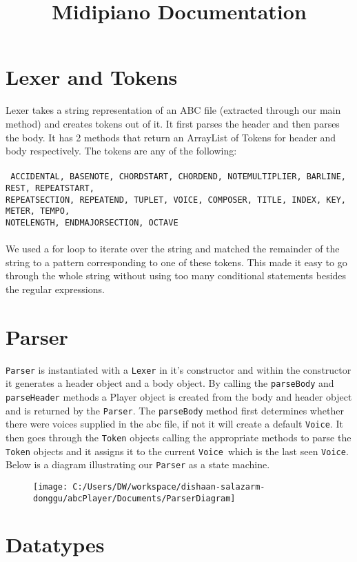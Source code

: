 \documentclass{article}
\title{Midipiano Documentation }
\begin{document}
\setlength{\headheight}{24pt}

\section{Lexer and Tokens}
 Lexer takes a string representation of an ABC file (extracted through our main method) and creates tokens out of it. It first parses the header and then parses the body. It has 2 methods that return an ArrayList of Tokens for header and body respectively. The tokens are any of the following:\\ \\
\texttt{
		ACCIDENTAL, BASENOTE, CHORDSTART, CHORDEND, NOTEMULTIPLIER, 
		BARLINE, REST, REPEATSTART,\\ REPEATSECTION, REPEATEND, TUPLET, VOICE,
		COMPOSER, TITLE, INDEX, KEY, METER, TEMPO, \\NOTELENGTH, ENDMAJORSECTION, OCTAVE
		}
\\ \\
We used a for loop to iterate over the string and matched the remainder of the string to a pattern corresponding to one of these tokens. This made it easy to go through the whole string without using too many conditional statements besides the regular expressions.
\section{Parser}
{\tt Parser} is instantiated with a {\tt Lexer} in it's constructor and within the constructor it generates a header object and a body object. By calling the {\tt parseBody} and {\tt parseHeader} methods a Player object is created from the body and header object and is returned by the {\tt Parser}. The {\tt parseBody} method first determines whether there were voices supplied in the abc file, if not it will create a default {\tt  Voice}. It then goes through the {\tt Token} objects calling the appropriate methods to parse the {\tt Token} objects and it assigns it to the current {\tt  Voice }which is the last seen {\tt Voice}. Below is a diagram illustrating our {\tt Parser} as a state machine.
\begin{figure}[htbp]
\centering
\texttt{[image: C:/Users/DW/workspace/dishaan-salazarm-donggu/abcPlayer/Documents/ParserDiagram]}
\caption{}
\label{fig:ParserDiagram}
\end{figure}




\section{Datatypes}
\end{document}
